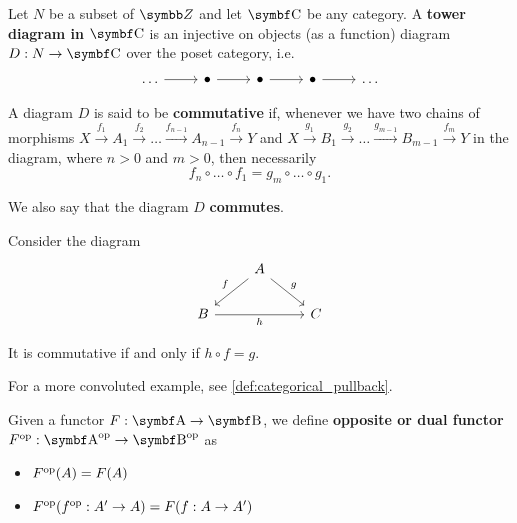 \begin{definition}\label{def:tower_diagram}
  Let \( N \) be a subset of \( \BB{Z} \) and let \( \Bold{C} \) be any category. A \textbf{tower diagram in \( \Bold{C} \)} is an injective on objects (as a function) diagram \( D: N \to \Bold{C} \) over the poset category, i.e.
  \begin{equation}\label{def:tower_diagram/diagram}
    \begin{tikzcd}
      \ldots \arrow[r] & \bullet \arrow[r] & \bullet \arrow[r] & \bullet \arrow[r] & \ldots
    \end{tikzcd}
  \end{equation}
\end{definition}

\begin{definition}\label{def:commutative_diagram}
  A diagram \( D \) is said to be \textbf{commutative} if, whenever we have two chains of morphisms \( X \overset {f_1} \to A_1 \overset {f_2} \to \ldots \overset {f_{n-1}} \to A_{n-1} \overset {f_n} \to Y \) and \( X \overset {g_1} \to B_1 \overset {g_2} \to \ldots \overset {g_{m-1}} \to B_{m-1} \overset {f_m} \to Y \) in the diagram, where \( n > 0 \) and \( m > 0 \), then necessarily
  \begin{equation*}
    f_n \circ \ldots \circ f_1 = g_m \circ \ldots \circ g_1.
  \end{equation*}

  We also say that the diagram \( D \) \textbf{commutes}.
\end{definition}

\begin{example}\label{ex:commutative_diagrams}
  Consider the diagram
  \begin{equation*}
    \begin{tikzcd}
                         & A \arrow[ld, "f"'] \arrow[rd, "g"] & \\
      B \arrow[rr, "h"'] &                                    & C
    \end{tikzcd}
  \end{equation*}

  It is commutative if and only if \( h \circ f = g \).

  For a more convoluted example, see \cref{def:categorical_pullback}.
\end{example}

\begin{definition}\label{def:opposite_functor}\cite[definition 5.2.1]{Leinster2014}
  Given a functor \( F: \Bold A \to \Bold B \), we define \textbf{opposite or dual functor} \( F^{\Op}: \Bold{A}^{\Op} \to \Bold{B}^{\Op} \) as
  \begin{itemize}
    \item \( F^{\operatorname{op}}(A) = F(A) \)
    \item \( F^{\operatorname{op}}(f^{\operatorname{op}}: A' \to A) = F(f: A \to A') \)
  \end{itemize}
\end{definition}

